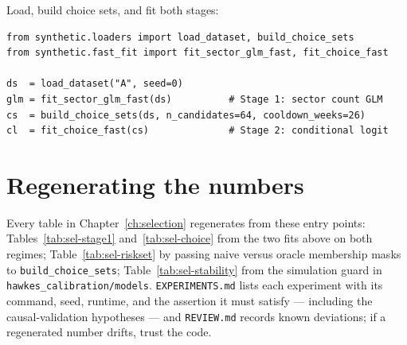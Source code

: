 Load, build choice sets, and fit both stages:

\begin{verbatim}
from synthetic.loaders import load_dataset, build_choice_sets
from synthetic.fast_fit import fit_sector_glm_fast, fit_choice_fast

ds  = load_dataset("A", seed=0)
glm = fit_sector_glm_fast(ds)          # Stage 1: sector count GLM
cs  = build_choice_sets(ds, n_candidates=64, cooldown_weeks=26)
cl  = fit_choice_fast(cs)              # Stage 2: conditional logit
\end{verbatim}

\section{Regenerating the numbers}\label{app:code-regen}

Every table in Chapter~\ref{ch:selection} regenerates from these entry points:
Tables~\ref{tab:sel-stage1} and~\ref{tab:sel-choice} from the two fits above on both regimes;
Table~\ref{tab:sel-riskset} by passing naive versus oracle membership masks to
\texttt{build\_choice\_sets}; Table~\ref{tab:sel-stability} from the simulation guard in
\texttt{hawkes\_calibration/models}. \texttt{EXPERIMENTS.md} lists each experiment with its command, seed,
runtime, and the assertion it must satisfy --- including the causal-validation hypotheses ---
and \texttt{REVIEW.md} records known deviations; if a regenerated number drifts, trust the code.
